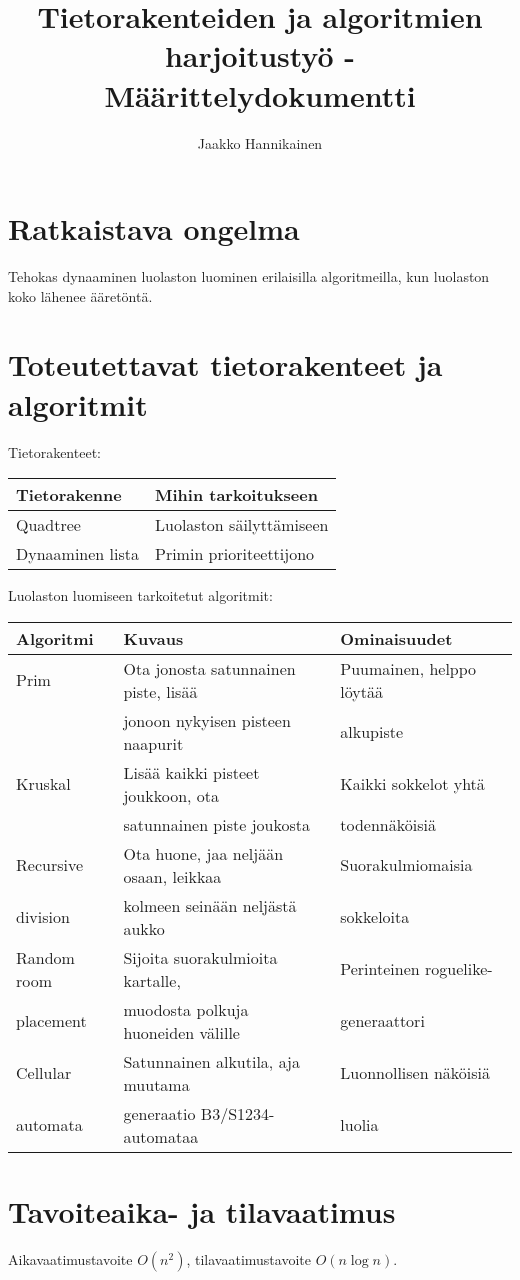 \documentclass{article}
\author{Jaakko Hannikainen}
\title{Tietorakenteiden ja algoritmien harjoitustyö - Määrittelydokumentti}
\begin{document}
\maketitle

\section{Ratkaistava ongelma}
Tehokas dynaaminen luolaston luominen erilaisilla algoritmeilla, kun luolaston
koko lähenee ääretöntä.

\section{Toteutettavat tietorakenteet ja algoritmit}
Tietorakenteet:

\begin{table}[h]
\begin{tabular}{| l | l |}
\hline
\rowcolor{Gray}
Tietorakenne               & Mihin tarkoitukseen      \\ \hline
Quadtree                   & Luolaston säilyttämiseen \\ \hline
Dynaaminen lista           & Primin prioriteettijono  \\ \hline
\end{tabular}
\end{table}

\noindent
Luolaston luomiseen tarkoitetut algoritmit:
\begin{table}[h]
\begin{tabular}{| l | p{6.5cm} | l |}
\hline
\rowcolor{Gray}
Algoritmi   & Kuvaus                                & Ominaisuudet              \\ \hline
Prim        & Ota jonosta satunnainen piste, lisää  & Puumainen, helppo löytää  \\
            & jonoon nykyisen pisteen naapurit      & alkupiste                 \\ \hline
Kruskal     & Lisää kaikki pisteet joukkoon, ota    & Kaikki sokkelot yhtä      \\
            & satunnainen piste joukosta            & todennäköisiä             \\ \hline
Recursive   & Ota huone, jaa neljään osaan, leikkaa & Suorakulmiomaisia         \\ 
division    & kolmeen seinään neljästä aukko        & sokkeloita                \\ \hline
Random room & Sijoita suorakulmioita kartalle,      & Perinteinen roguelike-    \\ 
placement   & muodosta polkuja huoneiden välille    & generaattori              \\ \hline
Cellular    & Satunnainen alkutila, aja muutama     & Luonnollisen näköisiä     \\ 
automata    & generaatio B3/S1234-automataa         & luolia                    \\ \hline
\end{tabular}
\end{table}

\section{Tavoiteaika- ja tilavaatimus}
Aikavaatimustavoite $O(n^2)$, tilavaatimustavoite $O(n \log n)$.
\end{document}
